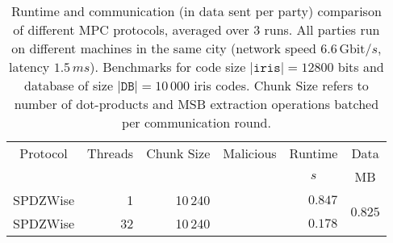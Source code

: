 \documentclass[a4paper,11pt,
]{article}
\newcommand{\cmark}{\ding{51}}%
\begin{document}
\begin{table}[ht]
    \centering
    \caption{Runtime and communication (in data sent per party) comparison of different MPC protocols, averaged over 3 runs. All parties run on different machines in the same city (network speed $6.6\,\text{Gbit}/s$, latency $1.5\,ms$). Benchmarks for code size $|\texttt{iris}| = 12800$ bits and database of size $|\texttt{DB}| = 10\,000$ iris codes. Chunk Size refers to number of dot-products and MSB extraction operations batched per communication round.}
    \label{tab::bench_network_10k}
    \begin{tabular}{lrrcrr}
        \toprule
        \multicolumn{1}{c}{Protocol} & \multicolumn{1}{c}{Threads} & \multicolumn{1}{c}{Chunk Size} & \multicolumn{1}{c}{Malicious} & \multicolumn{1}{c}{Runtime} & \multicolumn{1}{c}{Data} \\
                                     &                             &                                &                               & \multicolumn{1}{c}{$s$}     & \multicolumn{1}{c}{MB}   \\
        \midrule
        SPDZWise                     & 1                           & 10\,240                        & \cmark                        & $0.847$                     & \multirow{2}{*}{$0.825$} \\
        SPDZWise                     & 32                          & 10\,240                        & \cmark                        & $0.178$                     &                          \\
        \bottomrule
    \end{tabular}
\end{table}
\end{document}
